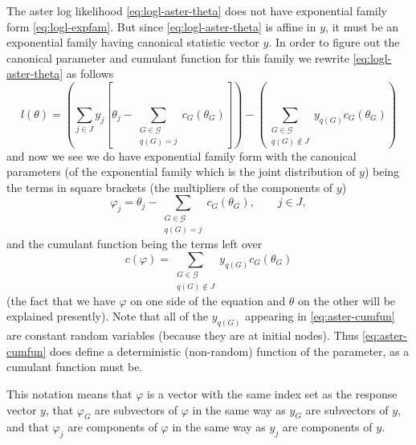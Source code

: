 The aster log likelihood \eqref{eq:logl-aster-theta} does not have
exponential family form \eqref{eq:logl-expfam}.
But since \eqref{eq:logl-aster-theta} is affine in $y$, it must be an
exponential family having canonical statistic vector $y$.  In order
to figure out the canonical parameter and cumulant function for this family
we rewrite \eqref{eq:logl-aster-theta} as follows
\begin{equation} \label{eq:logl-rewrite}
   l(\theta)
   =
   \left(
   \sum_{j \in J} y_j
   \left[ \theta_j - \sum_{\substack{G \in \mathcal{G} \\ q(G) = j}}
   c_G(\theta_G) \right]
   \right)
   -
   \left(
   \sum_{\substack{G \in \mathcal{G} \\ q(G) \notin J}}
   y_{q(G)} c_G(\theta_G) \right)
\end{equation}
and now we see we do have exponential family form with the canonical
parameters (of the exponential family which is the joint distribution of $y$)
being the terms in square brackets (the multipliers of the components of $y$)
\begin{equation} \label{eq:aster-transform}
   \varphi_j
   =
   \theta_j - \sum_{\substack{G \in \mathcal{G} \\ q(G) = j}} c_G(\theta_G),
   \qquad j \in J,
\end{equation}
and the cumulant function being the terms left over
\begin{equation} \label{eq:aster-cumfun}
   c(\varphi)
   =
   \sum_{\substack{G \in \mathcal{G} \\ q(G) \notin J}} y_{q(G)} c_G(\theta_G)
\end{equation}
(the fact that we have $\varphi$ on one side of the equation and $\theta$
on the other will be explained presently).
Note that all of the $y_{q(G)}$ appearing in \eqref{eq:aster-cumfun}
are constant random variables (because they are at initial nodes).
Thus \eqref{eq:aster-cumfun} does define a deterministic (non-random)
function of the parameter, as a cumulant function must be.

This notation means that $\varphi$ is a vector with the same index set as
the response vector $y$, that $\varphi_G$ are subvectors of $\varphi$
in the same way as $y_G$ are subvectors of $y$, and
that $\varphi_j$ are components of $\varphi$
in the same way as $y_j$ are components of $y$.

